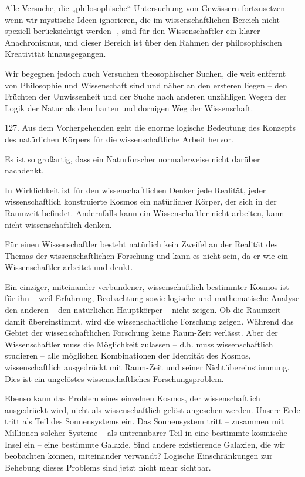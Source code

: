 \documentclass[11pt,a4paper]{book}
\begin{document}
Alle Versuche, die „philosophische“ Untersuchung von Gewässern fortzusetzen -- wenn wir mystische Ideen ignorieren, die im wissenschaftlichen Bereich nicht speziell berücksichtigt werden -, sind für den Wissenschaftler ein klarer Anachronismus, und dieser Bereich ist über den Rahmen der philosophischen Kreativität hinausgegangen.



Wir begegnen jedoch auch Versuchen theosophischer Suchen, die weit entfernt von Philosophie und Wissenschaft sind und näher an den ersteren liegen -- den Früchten der Unwissenheit und der Suche nach anderen unzähligen Wegen der Logik der Natur als dem harten und dornigen Weg der Wissenschaft.



127. Aus dem Vorhergehenden geht die enorme logische Bedeutung des Konzepts des natürlichen Körpers für die wissenschaftliche Arbeit hervor.



Es ist so großartig, dass ein Naturforscher normalerweise nicht darüber nachdenkt.



In Wirklichkeit ist für den wissenschaftlichen Denker jede Realität, jeder wissenschaftlich konstruierte Kosmos ein natürlicher Körper, der sich in der Raumzeit befindet. Andernfalls kann ein Wissenschaftler nicht arbeiten, kann nicht wissenschaftlich denken.



Für einen Wissenschaftler besteht natürlich kein Zweifel an der Realität des Themas der wissenschaftlichen Forschung und kann es nicht sein, da er wie ein Wissenschaftler arbeitet und denkt.



Ein einziger, miteinander verbundener, wissenschaftlich bestimmter Kosmos ist für ihn -- weil Erfahrung, Beobachtung sowie logische und mathematische Analyse den anderen -- den natürlichen Hauptkörper -- nicht zeigen. Ob die Raumzeit damit übereinstimmt, wird die wissenschaftliche Forschung zeigen. Während das Gebiet der wissenschaftlichen Forschung keine Raum-Zeit verlässt. Aber der Wissenschaftler muss die Möglichkeit zulassen -- d.h. muss wissenschaftlich studieren -- alle möglichen Kombinationen der Identität des Kosmos, wissenschaftlich ausgedrückt mit Raum-Zeit und seiner Nichtübereinstimmung. Dies ist ein ungelöstes wissenschaftliches Forschungsproblem.



Ebenso kann das Problem eines einzelnen Kosmos, der wissenschaftlich ausgedrückt wird, nicht als wissenschaftlich gelöst angesehen werden. Unsere Erde tritt als Teil des Sonnensystems ein. Das Sonnensystem tritt -- zusammen mit Millionen solcher Systeme -- als untrennbarer Teil in eine bestimmte kosmische Insel ein -- eine bestimmte Galaxie. Sind andere existierende Galaxien, die wir beobachten können, miteinander verwandt? Logische Einschränkungen zur Behebung dieses Problems sind jetzt nicht mehr sichtbar.
\end{document}
